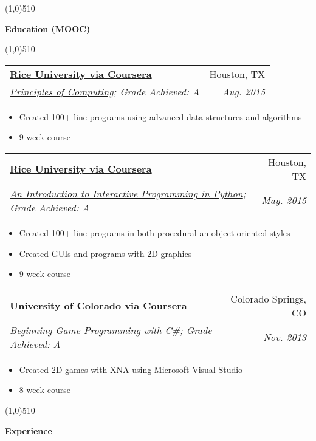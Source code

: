 \documentclass[letterpaper,11pt]{article}
\makeatletter
\newcommand{\resitem}[1]{\item #1 \vspace{-2pt}}
\newcommand{\resheading}[1]{{\large {\begin{minipage}{\textwidth}{\textbf{#1 \vphantom{p\^{E}}}}\end{minipage}}}}
\newcommand{\ressubheading}[4]{
\begin{tabular*}{6.5in}{l@{\extracolsep{\fill}}r}
		\textbf{#1} & #2 \\
		\textit{#3} & \textit{#4} \\
\end{tabular*}\vspace{-6pt}}
\makeatother
\begin{document}
\line(1,0){510}

\resheading{Education (MOOC)}

\line(1,0){510}

	\begin{description}

	\item
		\ressubheading {\href{http://www.rice.edu/}{Rice University via Coursera}}{Houston, TX}{\href{http://www.codeskulptor.org/coursera/principlescomputing.html}{Principles of Computing};  {Grade Achieved: A}}{ \footnotesize{Aug. 2015}}
		{ \footnotesize
				\begin{itemize}
					\resitem{Created 100+ line programs using advanced data structures and algorithms}
					\resitem{9-week course}
				\end{itemize}	}
	\item	
		\ressubheading {\href{http://www.rice.edu/}{Rice University via Coursera}}{Houston, TX}{\href{http://www.codeskulptor.org/coursera/interactivepython.html}{An Introduction to Interactive Programming in Python};  {Grade Achieved: A}}{ \footnotesize{May. 2015}}
		{ \footnotesize
				\begin{itemize}
					\resitem{Created 100+ line programs in both procedural an object-oriented styles}
					\resitem{Created GUIs and programs with 2D graphics}
					\resitem{9-week course}
					
				\end{itemize}	}
	\item	
		\ressubheading {\href{http://www.uccs.edu/}{University of Colorado via Coursera}}{Colorado Springs, CO}{\href{https://www.coursera.org/course/gameprogramming}{Beginning Game Programming with C\#};  {Grade Achieved: A}}{ \footnotesize{Nov. 2013}}	
			{ \footnotesize
		\begin{itemize}
					\resitem{Created 2D games with XNA using Microsoft Visual Studio}
					\resitem{8-week course}
				\end{itemize}	}	


	\end{description}

\line(1,0){510}

\resheading{Experience}
\end{document}
